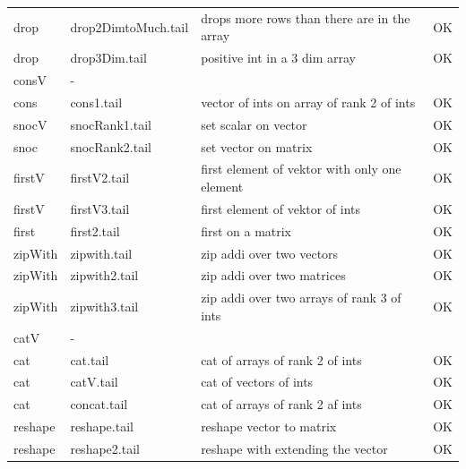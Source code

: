 \documentclass[11pt]{article}
\begin{document}
\begin{center}
\begin{tabular}{l l l l}
drop 			& drop2DimtoMuch.tail & drops more rows than there are in the array     & OK \\
drop 			& drop3Dim.tail		& positive int in a 3 dim array				& OK \\ 
consV		& -				&									&  \\
cons			& cons1.tail		& vector of ints on array of rank 2 of ints		& OK \\ 
snocV		& snocRank1.tail 	& set scalar on vector						& OK \\
snoc			& snocRank2.tail	& set vector on matrix 					& OK \\
firstV			& firstV2.tail		& first element of vektor with only one element	& OK \\
firstV			& firstV3.tail 		& first element of vektor of ints				& OK \\
first			& first2.tail			& first on a matrix						& OK \\
zipWith		& zipwith.tail		& zip addi over two vectors					& OK \\ 
zipWith 		& zipwith2.tail		& zip addi over two matrices				& OK \\
zipWith 		& zipwith3.tail		& zip addi over two arrays of rank 3 of ints		& OK \\
catV			& - 				& 									& \\
cat			& cat.tail			& cat of arrays of rank 2 of ints				& OK \\
cat			& catV.tail			& cat of vectors of ints					& OK \\
cat			& concat.tail		& cat of arrays of rank 2 af ints				& OK \\
reshape		& reshape.tail		& reshape vector to matrix					&  OK \\
reshape		& reshape2.tail		& reshape with extending the vector			&  OK \\
\end{tabular}
\end{center}
\end{document}
